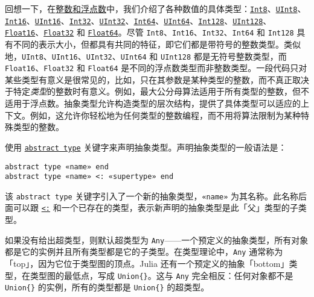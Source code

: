 回想一下，在\hyperlink{8249022581856827126}{整数和浮点数}中，我们介绍了各种数值的具体类型：\hyperlink{5857518405103968275}{\texttt{Int8}}、\hyperlink{6609065134969660118}{\texttt{UInt8}}、\hyperlink{6667287249103968645}{\texttt{Int16}}、\hyperlink{7018610346698168012}{\texttt{UInt16}}、\hyperlink{10103694114785108551}{\texttt{Int32}}、\hyperlink{8690996847580776341}{\texttt{UInt32}}、\hyperlink{7720564657383125058}{\texttt{Int64}}、\hyperlink{5500998675195555601}{\texttt{UInt64}}、\hyperlink{8012327724714767060}{\texttt{Int128}}、\hyperlink{14811222188335428522}{\texttt{UInt128}}、\hyperlink{2727296760866702904}{\texttt{Float16}}、\hyperlink{8101639384272933082}{\texttt{Float32}} 和 \hyperlink{5027751419500983000}{\texttt{Float64}}。尽管 \texttt{Int8}、\texttt{Int16}、\texttt{Int32}、\texttt{Int64} 和 \texttt{Int128} 具有不同的表示大小，但都具有共同的特征，即它们都是带符号的整数类型。类似地，\texttt{UInt8}、\texttt{UInt16}、\texttt{UInt32}、\texttt{UInt64} 和 \texttt{UInt128} 都是无符号整数类型，而 \texttt{Float16}、\texttt{Float32} 和 \texttt{Float64} 是不同的浮点数类型而非整数类型。一段代码只对某些类型有意义是很常见的，比如，只在其参数是某种类型的整数，而不真正取决于特定\emph{类型}的整数时有意义。例如，最大公分母算法适用于所有类型的整数，但不适用于浮点数。抽象类型允许构造类型的层次结构，提供了具体类型可以适应的上下文。例如，这允许你轻松地为任何类型的整数编程，而不用将算法限制为某种特殊类型的整数。



使用 \hyperlink{12403756508738429935}{\texttt{abstract type}} 关键字来声明抽象类型。声明抽象类型的一般语法是：




\begin{lstlisting}
abstract type «name» end
abstract type «name» <: «supertype» end
\end{lstlisting}



该 \texttt{abstract type} 关键字引入了一个新的抽象类型，\texttt{«name»} 为其名称。此名称后面可以跟 \hyperlink{6254591906563366276}{\texttt{<:}} 和一个已存在的类型，表示新声明的抽象类型是此「父」类型的子类型。



如果没有给出超类型，则默认超类型为 \texttt{Any}——一个预定义的抽象类型，所有对象都是它的实例并且所有类型都是它的子类型。在类型理论中，\texttt{Any} 通常称为「top」，因为它位于类型图的顶点。Julia 还有一个预定义的抽象「bottom」类型，在类型图的最低点，写成 \texttt{Union\{\}}。这与 \texttt{Any} 完全相反：任何对象都不是 \texttt{Union\{\}} 的实例，所有的类型都是 \texttt{Union\{\}} 的超类型。



